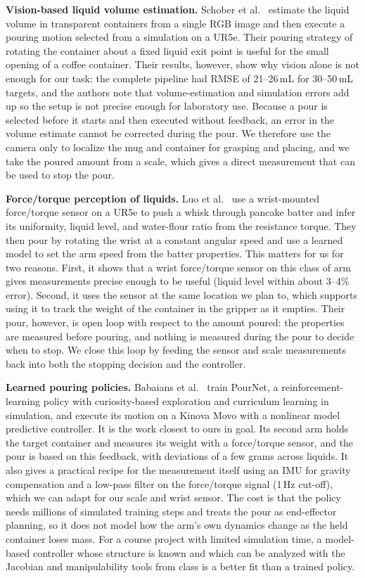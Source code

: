 \documentclass[conference]{IEEEtran}
\begin{document}
\textbf{Vision-based liquid volume estimation.}
Schober et al.\ \cite{schober2024} estimate the liquid volume in transparent containers from a single 
RGB image and then execute a pouring motion selected from a simulation on a UR5e. Their pouring strategy 
of rotating the container about a fixed liquid exit point is useful for the small opening of a coffee 
container. Their results, however, show why vision alone is not enough for our task: the complete pipeline 
had RMSE of 21--26\,mL for 30--50\,mL targets, and the authors note that volume-estimation and simulation 
errors add up so the setup is not precise enough for laboratory use. Because a pour is selected before it 
starts and then executed without feedback, an error in the volume estimate cannot be corrected during the pour. 
We therefore use the camera only to localize the mug and container for grasping and placing, and we take the 
poured amount from a scale, which gives a direct measurement that can be used to stop the pour.

\textbf{Force/torque perception of liquids.}
Luo et al.\ \cite{luo2024} use a wrist-mounted force/torque sensor on a UR5e to push a whisk through pancake 
batter and infer its uniformity, liquid level, and water-flour ratio from the resistance torque. They then 
pour by rotating the wrist at a constant angular speed and use a learned model to set the arm speed from the 
batter properties. This matters for us for two reasons. First, it shows that a wrist force/torque sensor on 
this class of arm gives measurements precise enough to be useful (liquid level within about 3--4\% error). 
Second, it uses the sensor at the same location we plan to, which supports using it to track the weight of the 
container in the gripper as it empties. Their pour, however, is open loop with respect to the amount poured: 
the properties are measured before pouring, and nothing is measured during the pour to decide when to stop. 
We close this loop by feeding the sensor and scale measurements back into both the stopping decision and the 
controller.

\textbf{Learned pouring policies.}
Babaians et al.\ \cite{babaians2022} train PourNet, a reinforcement-learning policy with curiosity-based 
exploration and curriculum learning in simulation, and execute its motion on a Kinova Movo with a nonlinear 
model predictive controller. It is the work closest to ours in goal. Its second arm holds the target container 
and measures its weight with a force/torque sensor, and the pour is based on this feedback, with deviations of 
a few grams across liquids. It also gives a practical recipe for the measurement itself using an IMU for 
gravity compensation and a low-pass filter on the force/torque signal (1\,Hz cut-off), which we can adapt for 
our scale and wrist sensor. The cost is that the policy needs millions of simulated training steps and treats 
the pour as end-effector planning, so it does not model how the arm's own dynamics change as the held container 
loses mass. For a course project with limited simulation time, a model-based controller whose structure is 
known and which can be analyzed with the Jacobian and manipulability tools from class is a better fit than a 
trained policy.
\end{document}
